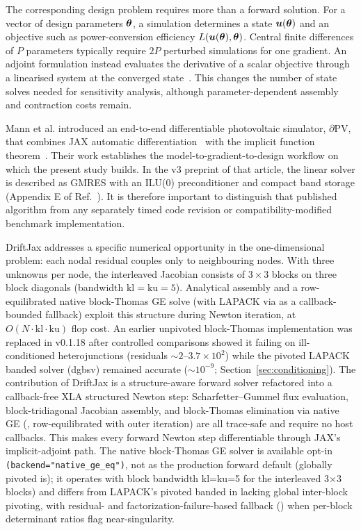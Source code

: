 The corresponding design problem requires more than a forward solution.
For a vector of design parameters $\boldsymbol{\theta}$, a simulation determines a
state $\boldsymbol{u}(\boldsymbol{\theta})$ and an objective such as power-conversion
efficiency $L(\boldsymbol{u}(\boldsymbol{\theta}),\boldsymbol{\theta})$. Central finite differences of
$P$ parameters typically require $2P$ perturbed simulations for one
gradient. An adjoint formulation instead evaluates the derivative of a
scalar objective through a linearised system at the converged
state~\cite{mann2022partial,blondel2022}.
This changes the number of state solves needed for sensitivity analysis,
although parameter-dependent assembly and contraction costs remain.

Mann et al. introduced an end-to-end differentiable photovoltaic simulator,
$\partial\mathrm{PV}$, that combines JAX automatic differentiation~\cite{bradbury2024} with
the implicit function theorem~\cite{mann2022partial}. Their work establishes
the model-to-gradient-to-design workflow on which the present study builds.
In the v3 preprint of that article, the linear solver is described
as GMRES with an ILU(0) preconditioner and compact band storage
(Appendix E of Ref.~\cite{mann2022partial}). It is therefore important to
distinguish that published algorithm from any separately timed code
revision or compatibility-modified benchmark implementation.

DriftJax addresses a specific numerical opportunity in the one-dimensional
problem: each nodal residual couples only to neighbouring nodes. With
three unknowns per node, the interleaved Jacobian consists of $3\times3$
blocks on three block diagonals (bandwidth $\mathrm{kl}=\mathrm{ku}=5$).
Analytical assembly and a row-equilibrated native block-Thomas GE solve (with LAPACK
 via  as a callback-bounded fallback) exploit this structure
during Newton iteration, at $O(N\cdot\mathrm{kl}\cdot\mathrm{ku})$ flop
cost. An earlier unpivoted block-Thomas implementation was replaced in
v0.1.18 after controlled comparisons showed it failing on
ill-conditioned heterojunctions (residuals $\sim2$--$3.7\times10^{2}$)
while the pivoted LAPACK banded solver (dgbsv) remained accurate
($\sim10^{-9}$; Section~\ref{sec:conditioning}).
The contribution of DriftJax is a structure-aware forward solver refactored into
a callback-free XLA structured Newton step: Scharfetter--Gummel flux evaluation,
block-tridiagonal Jacobian assembly, and block-Thomas elimination via native GE
(, row-equilibrated  with
 outer iteration) are all trace-safe and require no host
callbacks. This makes every forward Newton step differentiable through JAX's
 implicit-adjoint path. The native block-Thomas GE solver
is available opt-in \texttt{(backend="native_ge_eq")}, not as the production
forward default (globally pivoted  is); it operates with block
bandwidth kl=ku=5 for the interleaved 3×3 blocks) and differs from LAPACK's
pivoted banded  in lacking global inter-block pivoting, with
residual- and factorization-failure-based fallback () when
per-block determinant ratios flag near-singularity.

